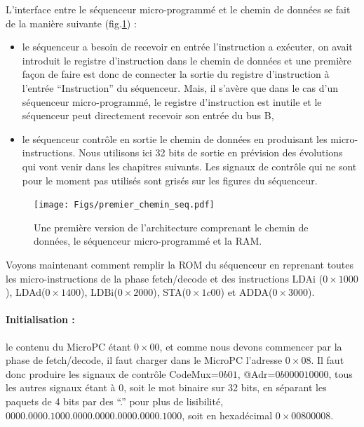 L'interface entre le séquenceur micro-programmé et le chemin de données se fait de la manière suivante (fig.\ref{fig:premier_chemin_seq}) :
\begin{itemize}
\item le séquenceur a besoin de recevoir en entrée l'instruction a exécuter, on avait introduit le registre d'instruction dans le chemin de données et une première façon de faire est donc de connecter la sortie du registre d'instruction à l'entrée ``Instruction'' du séquenceur. Mais, il s'avère que dans le cas d'un séquenceur micro-programmé, le registre d'instruction est inutile et le séquenceur peut directement recevoir son entrée du bus B,
\item le séquenceur contrôle en sortie le chemin de données en produisant les micro-instructions. Nous utilisons ici 32 bits de sortie en prévision des évolutions qui vont venir dans les chapitres suivants. Les signaux de contrôle qui ne sont pour le moment pas utilisés sont grisés sur les figures du séquenceur.
\end{itemize}

\begin{figure}[htbp]
\texttt{[image: Figs/premier\_chemin\_seq.pdf]}
\caption{\label{fig:premier_chemin_seq} Une première version de l'architecture comprenant le chemin de données, le séquenceur micro-programmé et la RAM.}
\end{figure}

Voyons maintenant comment remplir la ROM du séquenceur en reprenant toutes les micro-instructions de la phase fetch/decode et des instructions LDAi ($0\times1000$), LDAd($0\times1400$), LDBi($0\times2000$), STA($0\times1c00$) et ADDA($0\times3000$).

\paragraph{Initialisation :} le contenu du MicroPC étant $0\times00$, et comme nous devons commencer par la phase de fetch/decode, il faut charger dans le MicroPC l'adresse $0\times 08$. Il faut donc produire les signaux de contrôle CodeMux=$0b01$, @Adr=$0b000010000$, tous les autres signaux étant à 0, soit le mot binaire sur 32 bits, en séparant les paquets de 4 bits par des ``.'' pour plus de lisibilité, $0000.0000.1000.0000.0000.0000.0000.1000$, soit en hexadécimal $0\times00800008$.

